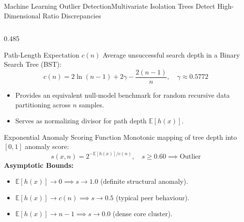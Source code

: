 \begin{frame}{Machine Learning Outlier Detection}{Multivariate Isolation Trees Detect High-Dimensional Ratio Discrepancies}
\begin{columns}[T,onlytextwidth]
        \begin{column}{0.485\textwidth}
            \begin{mathcard}[height=2.74cm]{Path-Length Expectation $c(n)$}
                \fontsize{5.7pt}{6.9pt}\selectfont
                Average unsuccessful search depth in a Binary Search Tree (BST):
                \begin{equation*}
                    \textstyle c(n) = 2\ln(n - 1) + 2\gamma - \frac{2(n - 1)}{n}, \quad \gamma \approx 0.5772
                \end{equation*}
                \begin{itemize}
                    \setlength{\itemsep}{0.8pt}
                    \item Provides an equivalent null-model benchmark for random recursive data partitioning across $n$ samples.
                    \item Serves as normalizing divisor for path depth $\mathbb{E}[h(x)]$.
                \end{itemize}
            \end{mathcard}

            \vspace{0.12cm}

            \begin{mathcard}[height=2.74cm]{Exponential Anomaly Scoring Function}
                \fontsize{5.5pt}{6.7pt}\selectfont
                Monotonic mapping of tree depth into $[0, 1]$ anomaly score:
                \begin{equation*}
                    \textstyle s(x, n) = 2^{-\mathbb{E}[h(x)]/c(n)}, \quad s \ge 0.60 \implies \text{Outlier}
                \end{equation*}
                \textbf{\color{deepemerald}Asymptotic Bounds:}
                \begin{itemize}
                    \setlength{\itemsep}{0.3pt}
                    \item $\mathbb{E}[h(x)] \to 0 \implies s \to 1.0$ (definite structural anomaly).
                    \item $\mathbb{E}[h(x)] \to c(n) \implies s \to 0.5$ (typical peer behaviour).
                    \item $\mathbb{E}[h(x)] \to n - 1 \implies s \to 0.0$ (dense core cluster).
                \end{itemize}
            \end{mathcard}
        \end{column}
    \end{columns}
\end{frame}
